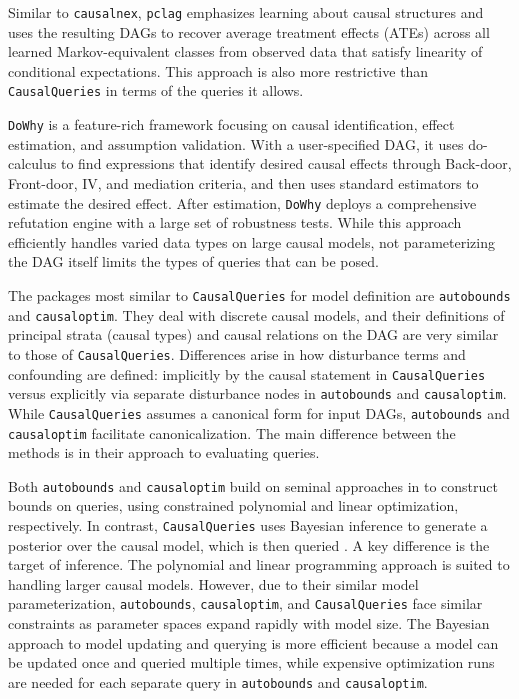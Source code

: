\documentclass[
  11pt,
  article]{jss}
\begin{document}
Similar to \texttt{causalnex}, \texttt{pclag} emphasizes learning about
causal structures and uses the resulting DAGs to recover average
treatment effects (ATEs) across all learned Markov-equivalent classes
from observed data that satisfy linearity of conditional expectations.
This approach is also more restrictive than \texttt{CausalQueries} in
terms of the queries it allows.

\texttt{DoWhy} is a feature-rich framework focusing on causal
identification, effect estimation, and assumption validation. With a
user-specified DAG, it uses do-calculus to find expressions that
identify desired causal effects through Back-door, Front-door, IV, and
mediation criteria, and then uses standard estimators to estimate the
desired effect. After estimation, \texttt{DoWhy} deploys a comprehensive
refutation engine with a large set of robustness tests. While this
approach efficiently handles varied data types on large causal models,
not parameterizing the DAG itself limits the types of queries that can
be posed.

The packages most similar to \texttt{CausalQueries} for model definition
are \texttt{autobounds} and \texttt{causaloptim}. They deal with
discrete causal models, and their definitions of principal strata
(causal types) and causal relations on the DAG are very similar to those
of \texttt{CausalQueries}. Differences arise in how disturbance terms
and confounding are defined: implicitly by the causal statement in
\texttt{CausalQueries} versus explicitly via separate disturbance nodes
in \texttt{autobounds} and \texttt{causaloptim}. While
\texttt{CausalQueries} assumes a canonical form for input DAGs,
\texttt{autobounds} and \texttt{causaloptim} facilitate
canonicalization. The main difference between the methods is in their
approach to evaluating queries.

Both \texttt{autobounds} and \texttt{causaloptim} build on seminal
approaches in \citet{balke_bounds_1997} to construct bounds on queries,
using constrained polynomial and linear optimization, respectively. In
contrast, \texttt{CausalQueries} uses Bayesian inference to generate a
posterior over the causal model, which is then queried \citep[consistent
with][]{chickering_clinicians_1996, zhang_partial_2022}. A key
difference is the target of inference. The polynomial and linear
programming approach is suited to handling larger causal models.
However, due to their similar model parameterization,
\texttt{autobounds}, \texttt{causaloptim}, and \texttt{CausalQueries}
face similar constraints as parameter spaces expand rapidly with model
size. The Bayesian approach to model updating and querying is more
efficient because a model can be updated once and queried multiple
times, while expensive optimization runs are needed for each separate
query in \texttt{autobounds} and \texttt{causaloptim}.
\end{document}
